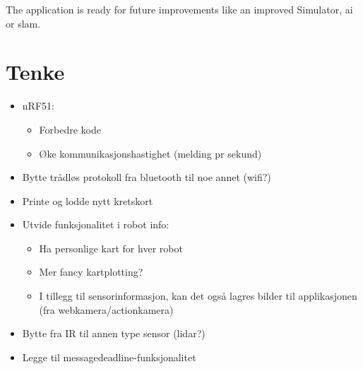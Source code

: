         The application is ready for future improvements like an improved Simulator, \acrshort{ai} or \acrshort{slam}.



    \section{Tenke}
\begin{itemize}
    \item nRF51:
    \begin{itemize}
        \item Forbedre kode
        \item Øke kommunikasjonshastighet (melding pr sekund)
    \end{itemize}
    \item Bytte trådløs protokoll fra bluetooth til noe annet (wifi?)
    \item Printe og lodde nytt kretskort
    \item Utvide funksjonalitet i robot info:
    \begin{itemize}
        \item Ha personlige kart for hver robot
        \item Mer fancy kartplotting?
        \item I tillegg til sensorinformasjon, kan det også lagres bilder til applikasjonen (fra webkamera/actionkamera)
    \end{itemize}
    \item Bytte fra IR til annen type sensor (lidar?)
    \item Legge til messagedeadline-funksjonalitet
\end{itemize}